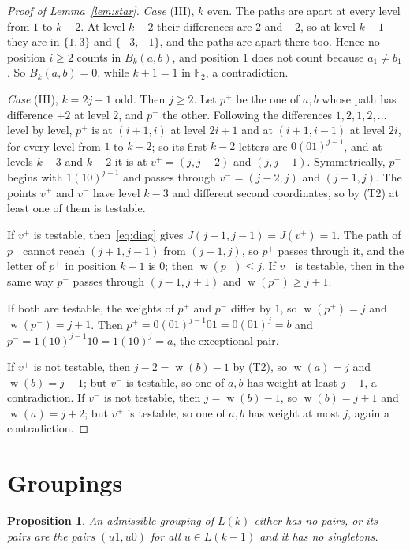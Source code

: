 \documentclass[11pt]{amsart}
\newtheorem{proposition}[theorem]{Proposition}
\theoremstyle{definition}
\theoremstyle{remark}
\numberwithin{equation}{section}
\newcommand{\F}{\mathbb{F}}
\DeclareMathOperator{\wt}{w}
\begin{document}
\begin{proof}[Proof of Lemma~\ref{lem:star}]
\emph{Case} (III), $k$ even. The paths are apart at every level from $1$ to $k-2$. At level $k-2$ their differences are $2$ and $-2$, so at level $k-1$ they are in $\{1,3\}$ and $\{-3,-1\}$, and the paths are apart there too. Hence no position $i\ge2$ counts in $B_k(a,b)$, and position $1$ does not count because $a_1\ne b_1$. So $B_k(a,b)=0$, while $k+1=1$ in $\F_2$, a contradiction.

\emph{Case} (III), $k=2j+1$ odd. Then $j\ge2$. Let $p^+$ be the one of $a,b$ whose path has difference $+2$ at level $2$, and $p^-$ the other. Following the differences $1,2,1,2,\dots$ level by level, $p^+$ is at $(i+1,i)$ at level $2i+1$ and at $(i+1,i-1)$ at level $2i$, for every level from $1$ to $k-2$; so its first $k-2$ letters are $0(01)^{j-1}$, and at levels $k-3$ and $k-2$ it is at $v^+=(j,j-2)$ and $(j,j-1)$. Symmetrically, $p^-$ begins with $1(10)^{j-1}$ and passes through $v^-=(j-2,j)$ and $(j-1,j)$. The points $v^+$ and $v^-$ have level $k-3$ and different second coordinates, so by (T2) at least one of them is testable.

If $v^+$ is testable, then~\eqref{eq:diag} gives $J(j+1,j-1)=J(v^+)=1$. The path of $p^-$ cannot reach $(j+1,j-1)$ from $(j-1,j)$, so $p^+$ passes through it, and the letter of $p^+$ in position $k-1$ is $0$; then $\wt(p^+)\le j$. If $v^-$ is testable, then in the same way $p^-$ passes through $(j-1,j+1)$ and $\wt(p^-)\ge j+1$.

If both are testable, the weights of $p^+$ and $p^-$ differ by $1$, so $\wt(p^+)=j$ and $\wt(p^-)=j+1$. Then $p^+=0(01)^{j-1}01=0(01)^j=b$ and $p^-=1(10)^{j-1}10=1(10)^j=a$, the exceptional pair.

If $v^+$ is not testable, then $j-2=\wt(b)-1$ by (T2), so $\wt(a)=j$ and $\wt(b)=j-1$; but $v^-$ is testable, so one of $a,b$ has weight at least $j+1$, a contradiction. If $v^-$ is not testable, then $j=\wt(b)-1$, so $\wt(b)=j+1$ and $\wt(a)=j+2$; but $v^+$ is testable, so one of $a,b$ has weight at most $j$, again a contradiction.
\end{proof}

\section{Groupings}\label{sec:groupings}

\begin{proposition}\label{prop:groupings}
An admissible grouping of $L(k)$ either has no pairs, or its pairs are the pairs $(u1,u0)$ for all $u\in L(k-1)$ and it has no singletons.
\end{proposition}
\end{document}
